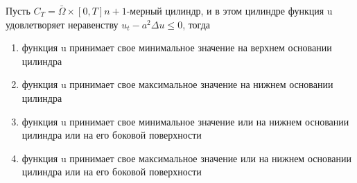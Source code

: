 Пусть \(C_T=\bar{\Omega }\times \left[0,T\right] n+1\)-мерный цилиндр, и в этом цилиндре функция u удовлетворяет неравенству \(u_t-a^2\Delta u\leq 0\), тогда

\begin{enumerate}[label=\arabic*)]
    \item функция u принимает свое минимальное значение на верхнем основании цилиндра
    \item функция u принимает свое максимальное значение на нижнем основании цилиндра
    \item функция u принимает свое минимальное значение или на нижнем основании цилиндра или на его боковой поверхности
    \item функция u принимает свое максимальное значение или на нижнем основании цилиндра или на его боковой поверхности
\end{enumerate}

